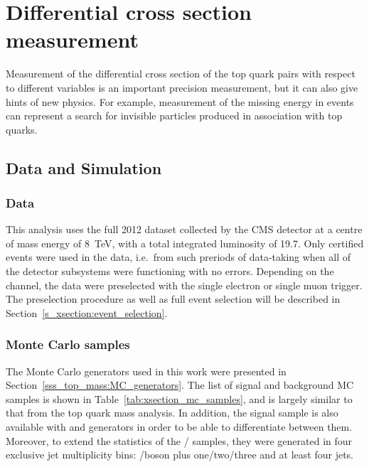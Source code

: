 
\chapter[Differential cross section measurement]{Differential cross section measurement}
\label{c:xsection_analysis}
\ifpdf
    \graphicspath{{06_Cross_section_analysis/plots/}}
\else
    \graphicspath{{06_Cross_section_analysis/plots/EPS/}{06_Cross_section_analysis/plots/}}
\fi

Measurement of the differential cross section of the top quark pairs with respect to different variables is an important
precision measurement, but it can also give hints of new physics. For example, measurement of the missing energy in
\ttbar events can represent a search for invisible particles produced in association with top quarks.

\section{Data and Simulation}
\label{s_xsection:data_and_simulation}

\subsection{Data}
\label{ss_xsection:data}
This analysis uses the full 2012 dataset collected by the CMS detector at a centre of mass energy of \SI{8}{\TeV}, with
a total integrated luminosity of \SI{19.7}{\fbinv}. Only certified events were used in the data, i.e.\ from such
preriods of data-taking when all of the detector subsystems were functioning with no errors. Depending on the channel,
the data were preselected with the single electron or single muon trigger. The preselection procedure as well as full
event selection will be described in Section~\ref{s_xsection:event_selection}.

\subsection{Monte Carlo samples}
\label{ss_xsection:MC_samples}
The Monte Carlo generators used in this work were presented in Section~\ref{sss_top_mass:MC_generators}. The list of
signal and background MC samples is shown in Table~\ref{tab:xsection_mc_samples}, and is largely similar to that from
the top quark mass analysis. In addition, the signal \ttjets sample is also available with \POWHEG and \MCATNLO
generators in order to be able to differentiate between them. Moreover, to extend the statistics of the \W/\ZpJets
samples, they were generated in four exclusive jet multiplicity bins: \W/\Z boson plus one/two/three and at least four
jets.



